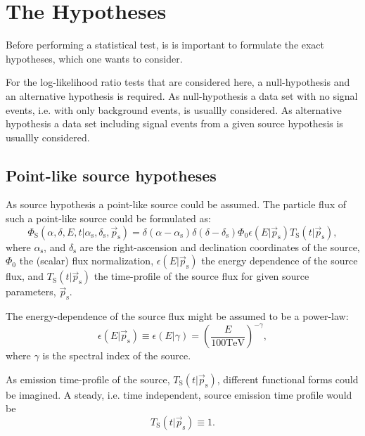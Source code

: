 \documentclass{article}
\newcommand{\ps}{\vec{p}_{\mathrm{s}}}
\begin{document}
\section{The Hypotheses}

Before performing a statistical test, is is important to formulate the exact hypotheses,
which one wants to consider.

For the log-likelihood ratio tests that are considered here, a null-hypothesis
and an alternative hypothesis is required. As null-hypothesis a data set with
no signal events, i.e. with only background events, is usuallly considered.
As alternative hypothesis a data set including signal events from a given source
hypothesis is usuallly considered.

\subsection{Point-like source hypotheses}
\label{sec:point-like-source-hypotheses}

As source hypothesis a point-like source could be assumed. The particle flux of
such a point-like source could be formulated as:
\begin{equation}
 \Phi_{\mathrm{S}}(\alpha,\delta,E,t|\alpha_{\mathrm{s}}, \delta_{\mathrm{s}},\ps) = \delta(\alpha-\alpha_{\mathrm{s}})\delta(\delta-\delta_{\mathrm{s}}) \Phi_0 \epsilon(E|\ps) T_{\mathrm{S}}(t|\ps),
\end{equation}
where $\alpha_{\mathrm{s}}$, and $\delta_{\mathrm{s}}$ are the right-ascension
and declination coordinates of the source, $\Phi_0$ the (scalar) flux normalization,
$\epsilon(E|\ps)$ the energy dependence of the source flux, and
$T_{\mathrm{S}}(t|\ps)$ the time-profile of the source flux for given source parameters,
$\ps$.

The energy-dependence of the source flux might be assumed to be a power-law:
\begin{equation}
 \epsilon(E|\ps) \equiv \epsilon(E|\gamma) = \left(\frac{E}{100\mathrm{TeV}}\right)^{-\gamma},
\end{equation}
where $\gamma$ is the spectral index of the source.

As emission time-profile of the source, $T_{\mathrm{S}}(t|\ps)$, different functional
forms could be imagined.
A steady, i.e. time independent, source emission time profile would be
\begin{equation}
 T_{\mathrm{S}}(t|\ps) \equiv 1.
\end{equation}
\end{document}
